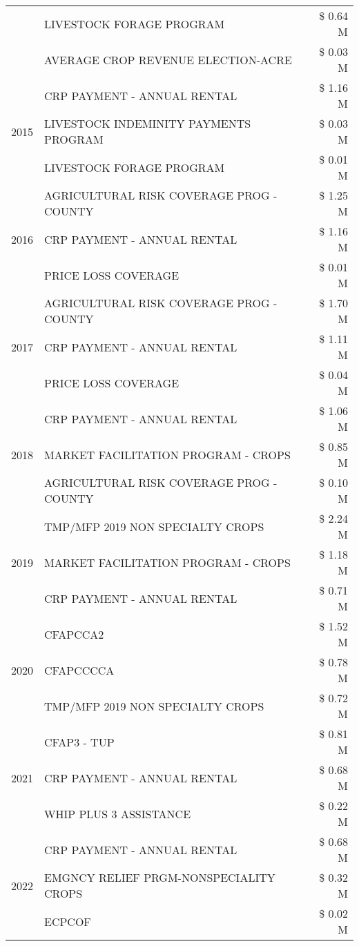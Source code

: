 \begin{tabular}{llr}
 & LIVESTOCK FORAGE PROGRAM & \$ 0.64 M \\
 & AVERAGE CROP REVENUE ELECTION-ACRE & \$ 0.03 M \\
\cline{1-3}
\multirow[t]{3}{*}{2015} & CRP PAYMENT - ANNUAL RENTAL & \$ 1.16 M \\
 & LIVESTOCK INDEMINITY PAYMENTS PROGRAM & \$ 0.03 M \\
 & LIVESTOCK FORAGE PROGRAM & \$ 0.01 M \\
\cline{1-3}
\multirow[t]{3}{*}{2016} & AGRICULTURAL RISK COVERAGE PROG - COUNTY & \$ 1.25 M \\
 & CRP PAYMENT - ANNUAL RENTAL & \$ 1.16 M \\
 & PRICE LOSS COVERAGE & \$ 0.01 M \\
\cline{1-3}
\multirow[t]{3}{*}{2017} & AGRICULTURAL RISK COVERAGE PROG - COUNTY & \$ 1.70 M \\
 & CRP PAYMENT - ANNUAL RENTAL & \$ 1.11 M \\
 & PRICE LOSS COVERAGE & \$ 0.04 M \\
\cline{1-3}
\multirow[t]{3}{*}{2018} & CRP PAYMENT - ANNUAL RENTAL & \$ 1.06 M \\
 & MARKET FACILITATION PROGRAM - CROPS & \$ 0.85 M \\
 & AGRICULTURAL RISK COVERAGE PROG - COUNTY & \$ 0.10 M \\
\cline{1-3}
\multirow[t]{3}{*}{2019} & TMP/MFP 2019 NON SPECIALTY CROPS & \$ 2.24 M \\
 & MARKET FACILITATION PROGRAM - CROPS & \$ 1.18 M \\
 & CRP PAYMENT - ANNUAL RENTAL & \$ 0.71 M \\
\cline{1-3}
\multirow[t]{3}{*}{2020} & CFAPCCA2 & \$ 1.52 M \\
 & CFAPCCCCA & \$ 0.78 M \\
 & TMP/MFP 2019 NON SPECIALTY CROPS & \$ 0.72 M \\
\cline{1-3}
\multirow[t]{3}{*}{2021} & CFAP3 - TUP & \$ 0.81 M \\
 & CRP PAYMENT - ANNUAL RENTAL & \$ 0.68 M \\
 & WHIP PLUS 3 ASSISTANCE & \$ 0.22 M \\
\cline{1-3}
\multirow[t]{3}{*}{2022} & CRP PAYMENT - ANNUAL RENTAL & \$ 0.68 M \\
 & EMGNCY RELIEF PRGM-NONSPECIALITY CROPS & \$ 0.32 M \\
 & ECPCOF & \$ 0.02 M \\
\cline{1-3}
\bottomrule
\end{tabular}
